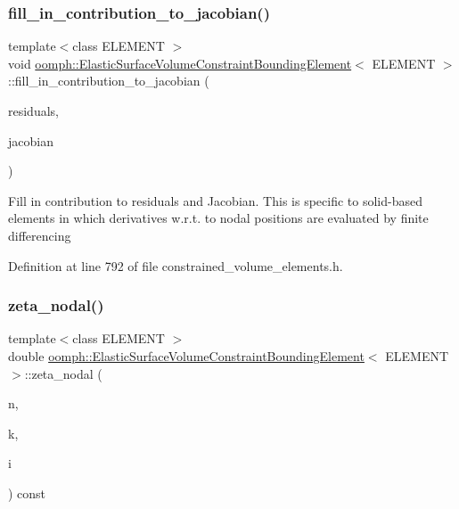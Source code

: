 \subsubsection{\texorpdfstring{fill\+\_\+in\+\_\+contribution\+\_\+to\+\_\+jacobian()}{fill\_in\_contribution\_to\_jacobian()}}
{\footnotesize\ttfamily template$<$class E\+L\+E\+M\+E\+NT $>$ \\
void \hyperlink{classoomph_1_1ElasticSurfaceVolumeConstraintBoundingElement}{oomph\+::\+Elastic\+Surface\+Volume\+Constraint\+Bounding\+Element}$<$ E\+L\+E\+M\+E\+NT $>$\+::fill\+\_\+in\+\_\+contribution\+\_\+to\+\_\+jacobian (\begin{DoxyParamCaption}\item[{Vector$<$ double $>$ \&}]{residuals,  }\item[{Dense\+Matrix$<$ double $>$ \&}]{jacobian }\end{DoxyParamCaption})\hspace{0.3cm}{\ttfamily [inline]}}

Fill in contribution to residuals and Jacobian. This is specific to solid-\/based elements in which derivatives w.\+r.\+t. to nodal positions are evaluated by finite differencing 

Definition at line 792 of file constrained\+\_\+volume\+\_\+elements.\+h.

\mbox{\label{classoomph_1_1ElasticSurfaceVolumeConstraintBoundingElement_ab9826b68e1931ed4eafdf20af0bf070d}} 
\subsubsection{\texorpdfstring{zeta\+\_\+nodal()}{zeta\_nodal()}}
{\footnotesize\ttfamily template$<$class E\+L\+E\+M\+E\+NT $>$ \\
double \hyperlink{classoomph_1_1ElasticSurfaceVolumeConstraintBoundingElement}{oomph\+::\+Elastic\+Surface\+Volume\+Constraint\+Bounding\+Element}$<$ E\+L\+E\+M\+E\+NT $>$\+::zeta\+\_\+nodal (\begin{DoxyParamCaption}\item[{const unsigned \&}]{n,  }\item[{const unsigned \&}]{k,  }\item[{const unsigned \&}]{i }\end{DoxyParamCaption}) const\hspace{0.3cm}{\ttfamily [inline]}}




